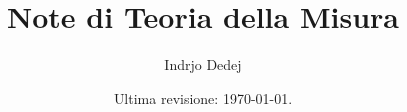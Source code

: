 


\title{Note di Teoria della Misura}
\author{Indrjo Dedej}
\date{Ultima revisione: \today{}.}
\makeindex[title=Indice Analitico, intoc=true]



\maketitle

\tableofcontents




%


\printindex


